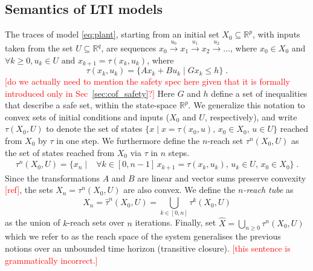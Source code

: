 \documentclass[sigconf]{llncs}
\newcommand{\mat}[1]{{#1}}
\renewcommand{\vec}[1]{{#1}}
\renewcommand{\note}[1]{\textcolor{red}{[#1]}}
\begin{document}
\subsection{Semantics of LTI models}\label{sec:model_semantics}
%
The traces of model \eqref{eq:plant}, 
starting from an initial set $X_0\subseteq \mathbb{R}^p$, 
with inputs taken from the set $U \subseteq \mathbb{R}^q$, are sequences 
$ \vec{x}_0 \xrightarrow{\vec{u}_0} \vec{x}_1 \xrightarrow{\vec{u}_1} \vec{x}_2 \xrightarrow{\vec{u}_2} \ldots $, 
%
where $ \vec{x}_0 \in X_0$ and $\forall k\geq 0, \vec{u}_k \in U \text{ and } \vec{x}_{k+1} = \tau(\vec{x}_k,\vec{u}_k) $, 
where 
%
\begin{equation}\label{equ:reachtraj}
\tau(\vec{x}_k,\vec{u}_k) = 
\big\{ \mat{A}\vec{x}_k +
\mat{B}\vec{u}_k \mid \mat{G}\vec{x}_k \leq \vec{h}\big\}\;. 
\end{equation}
\note{do we actually need to mention the safety spec here given that it is formally introduced only in Sec~\ref{sec:cof_safety}?}
%
Here $\mat{G}$ and $\vec{h}$ define a set of inequalities that describe a safe set, within the state-space $\mathbb{R}^p$.
%
We generalize this notation to convex sets of initial conditions and inputs ($X_0$ and $U$, respectively), 
and write $\tau(X_0,U)$ to denote the set of states $\{\vec{x} \mid \vec{x} = \tau(\vec{x}_0,\vec{u}),\, \vec{x}_0 \in
X_0,\, \vec{u} \in U \}$
reached from $X_0$ by $\tau$ in one step. 
%
We furthermore define the $n$-reach set $\tau^n(X_0,U)$ as the set of states reached from
$X_0$ via $\tau$ in $n$ steps.
%
\begin{align}\label{equ:reachset}
\tau^n(X_0,U) = \{\vec{x}_n \mid & 
\forall k\in [0,n-1] \, \vec{x}_{k+1}=\tau(\vec{x}_{k},\vec{u}_{k}), \,
\vec{u}_{k} \in U, \,   
\vec{x}_0 \in X_0
\} \;. 
\end{align}
%
Since the transformations $\mat{A}$ and $\mat{B}$ are linear and vector sums preserve convexity \note{ref}, 
the sets $X_n = \tau^n(X_0,U)$ are also convex.  
We define the \emph{$n$-reach tube} as 
\begin{equation}\label{equ:reachtube}
\hat{X}_n=\hat{\tau}^n(X_0,U)=\bigcup_{k\in[0,n]} \tau^k(X_0,U)
\end{equation}
as the union of $k$-reach sets over $n$ iterations. 
%
Finally, set $\hat{X} =\bigcup_{n\geq 0} \tau^n(X_0,U)$ which we refer to as
the reach space of the system generalises the previous notions over an unbounded
time horizon (transitive closure). \note{this sentence is grammatically incorrect.}
\end{document}
